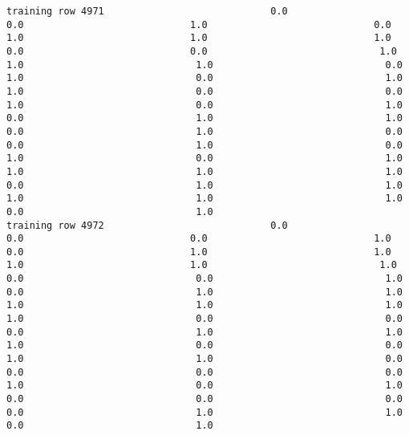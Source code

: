 \documentclass[11pt]{article}
\begin{document}
\begin{verbatim}
training row 4971                             0.0                             0.0                             1.0                             0.0                             1.0                             1.0                             1.0                             0.0                             0.0                              1.0                              1.0                              1.0                              0.0                              1.0                              0.0                              1.0                              1.0                              0.0                              0.0                              1.0                              0.0                              1.0                              0.0                              1.0                              1.0                              0.0                              1.0                              0.0                              0.0                              1.0                              0.0                              1.0                              0.0                              1.0                              1.0                              1.0                              1.0                              0.0                              1.0                              1.0                              1.0                              1.0                              1.0                              0.0                              1.0
training row 4972                             0.0                             0.0                             0.0                             1.0                             0.0                             1.0                             1.0                             1.0                             1.0                              1.0                              0.0                              0.0                              1.0                              0.0                              1.0                              1.0                              1.0                              1.0                              1.0                              1.0                              0.0                              0.0                              0.0                              1.0                              1.0                              1.0                              0.0                              0.0                              1.0                              1.0                              0.0                              0.0                              0.0                              0.0                              1.0                              0.0                              1.0                              0.0                              0.0                              0.0                              0.0                              1.0                              1.0                              0.0                              1.0

\end{verbatim}
\end{document}
